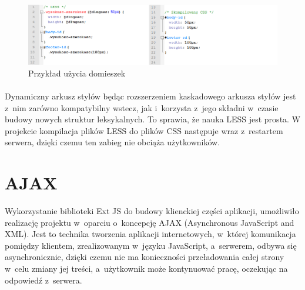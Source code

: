 \begin{figure}[h!]
	\centering
	\includegraphics[width=1.00\textwidth]{images/less2.png}
	\caption{Przykład użycia domieszek}
\end{figure}
\paragraph{}

Dynamiczny arkusz stylów  będąc rozszerzeniem kaskadowego arkusza stylów jest z~nim zarówno kompatybilny wstecz, jak i~korzysta z~jego składni w~czasie budowy nowych struktur leksykalnych. To sprawia, że nauka LESS jest prosta.
W projekcie kompilacja plików LESS do plików CSS następuje wraz z~restartem serwera, dzięki czemu ten zabieg nie obciąża użytkowników.\cite{LESS}


\section{AJAX}
Wykorzystanie biblioteki Ext JS do budowy klienckiej części aplikacji, umożliwiło realizację projektu w~oparciu o~koncepcję AJAX (Asynchronous JavaScript and XML). Jest to technika tworzenia aplikacji internetowych, w~której komunikacja pomiędzy klientem, zrealizowanym w~języku JavaScript, a~serwerem, odbywa się asynchronicznie, dzięki czemu nie ma konieczności przeładowania całej strony w~celu zmiany jej treści, a~użytkownik może kontynuować pracę, oczekując na odpowiedź z~serwera.\cite{ajaxWoj}

